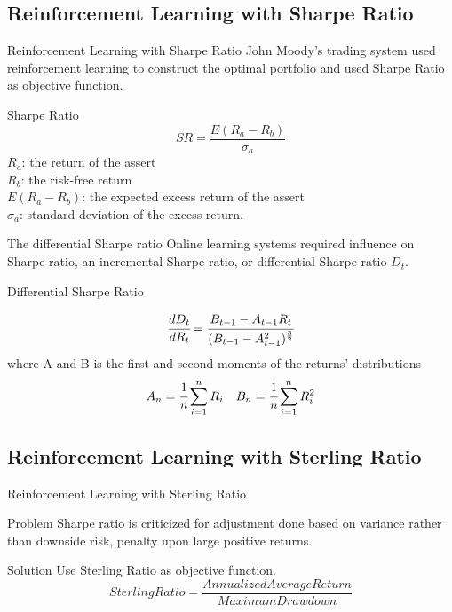 \subsection{Reinforcement Learning with Sharpe Ratio}
\begin{frame}{Reinforcement Learning with Sharpe Ratio}
John Moody's trading system used reinforcement learning to construct the optimal portfolio and used Sharpe Ratio as objective function.

\begin{block}{Sharpe Ratio}
\[ SR = \frac{E(R_a - R_b)}{\sigma_a}\]
\(R_a\): the return of the assert
\\
\(R_b\): the risk-free return
\\
\(E(R_a - R_b)\): the expected excess return of the assert
\\
\(\sigma_a\): standard deviation of the excess return.
\end{block}
\end{frame}



\begin{frame}{The differential Sharpe ratio}
Online learning systems required influence on Sharpe ratio, an incremental Sharpe ratio, or differential Sharpe ratio \(D_t\).
\begin{block}{Differential Sharpe Ratio}

\[
\cfrac{d D_t}{d R_t} = 
\cfrac{B_{t-1}-A_{t-1} R_t}{(B_{t-1}-A_{t-1}^2)^\frac{3}{2}}
\]
where
A and B is the first and second moments of the returns' distributions
\[ A_n = \cfrac{1}{n}\sum_{i=1}^nR_i\quad
B_n = \cfrac{1}{n}\sum_{i=1}^nR_i^2
\]
\end{block}
\end{frame}



\subsection{Reinforcement Learning with Sterling Ratio}
\begin{frame}{Reinforcement Learning with Sterling Ratio}
\begin{block}{Problem}
Sharpe ratio is criticized for adjustment done based on variance rather than downside risk, penalty upon large positive returns.
\end{block}
\begin{block}{Solution}
Use Sterling Ratio as objective function.
\[
Sterling Ratio=\frac{Annualized Average Return}{Maximum Drawdown}
\]
\end{block}

\end{frame}

